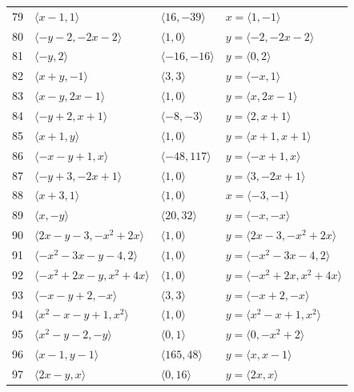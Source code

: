\documentclass[11pt]{article}
\begin{document}
\begin{longtable}{@{}rlll@{}}
79 & $\langle x-1,1\rangle$ & $\langle 16,-39\rangle$ & $x=\langle 1,-1\rangle$\\
80 & $\langle -y-2,-2x-2\rangle$ & $\langle 1,0\rangle$ & $y=\langle -2,-2x-2\rangle$\\
81 & $\langle -y,2\rangle$ & $\langle -16,-16\rangle$ & $y=\langle 0,2\rangle$\\
82 & $\langle x+y,-1\rangle$ & $\langle 3,3\rangle$ & $y=\langle -x,1\rangle$\\
83 & $\langle x-y,2x-1\rangle$ & $\langle 1,0\rangle$ & $y=\langle x,2x-1\rangle$\\
84 & $\langle -y+2,x+1\rangle$ & $\langle -8,-3\rangle$ & $y=\langle 2,x+1\rangle$\\
85 & $\langle x+1,y\rangle$ & $\langle 1,0\rangle$ & $y=\langle x+1,x+1\rangle$\\
86 & $\langle -x-y+1,x\rangle$ & $\langle -48,117\rangle$ & $y=\langle -x+1,x\rangle$\\
87 & $\langle -y+3,-2x+1\rangle$ & $\langle 1,0\rangle$ & $y=\langle 3,-2x+1\rangle$\\
88 & $\langle x+3,1\rangle$ & $\langle 1,0\rangle$ & $x=\langle -3,-1\rangle$\\
89 & $\langle x,-y\rangle$ & $\langle 20,32\rangle$ & $y=\langle -x,-x\rangle$\\
90 & $\langle 2x-y-3,-x^{2}+2x\rangle$ & $\langle 1,0\rangle$ & $y=\langle 2x-3,-x^{2}+2x\rangle$\\
91 & $\langle -x^{2}-3x-y-4,2\rangle$ & $\langle 1,0\rangle$ & $y=\langle -x^{2}-3x-4,2\rangle$\\
92 & $\langle -x^{2}+2x-y,x^{2}+4x\rangle$ & $\langle 1,0\rangle$ & $y=\langle -x^{2}+2x,x^{2}+4x\rangle$\\
93 & $\langle -x-y+2,-x\rangle$ & $\langle 3,3\rangle$ & $y=\langle -x+2,-x\rangle$\\
94 & $\langle x^{2}-x-y+1,x^{2}\rangle$ & $\langle 1,0\rangle$ & $y=\langle x^{2}-x+1,x^{2}\rangle$\\
95 & $\langle x^{2}-y-2,-y\rangle$ & $\langle 0,1\rangle$ & $y=\langle 0,-x^{2}+2\rangle$\\
96 & $\langle x-1,y-1\rangle$ & $\langle 165,48\rangle$ & $y=\langle x,x-1\rangle$\\
97 & $\langle 2x-y,x\rangle$ & $\langle 0,16\rangle$ & $y=\langle 2x,x\rangle$\\
\end{longtable}
\endgroup
\end{document}
